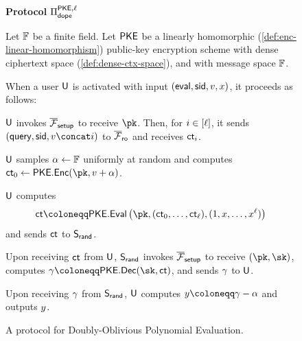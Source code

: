 \begin{figure}[h]
	\begin{center}
		\begin{techbox}
			\centerline{\textbf{Protocol} $\pdope[\ell]$}
			Let $\field$ be a finite field.
			Let $\encscheme$ be a linearly homomorphic (\cref{def:enc-linear-homomorphism}) public-key encryption scheme with dense ciphertext space (\cref{def:dense-ctx-space}), and with message space $\field$.

			\boxsep
			When a user $\user$ is activated with input $(\eval, \sid, \val, x)$, it proceeds as follows:
			\begin{algenumerate}
				\item $\user$ invokes $\fsetup$ to receive $\pk$.
				Then, for $i \in \nrange{\ell}$, it sends $(\query, \sid, \val \concat i)$ to $\frandoracle$ and receives $\ct_i$.

				\item $\user$ samples $\dopemask \gets \field$ uniformly at random and computes $\ct_0 \gets \encscheme.\Enc(\pk, v + \dopemask)$.

				\item $\user$ computes
				\begin{equation*}
					\dopectmasked \coloneqq \encscheme.\Eval\parens{\pk, (\ct_0, \dots, \ct_{\ell}), (1, x, \dots, x^{\ell})}
				\end{equation*}
				and sends $\dopectmasked$ to $\randserver$.

				\item Upon receiving $\dopectmasked$ from $\user$, $\randserver$ invokes $\fsetup$ to receive $(\pk, \sk)$, computes $\dopemaskedshare \coloneqq \encscheme.\Dec(\sk, \dopectmasked)$, and sends $\dopemaskedshare$ to $\user$.

				\item Upon receiving $\dopemaskedshare$ from $\randserver$, $\user$ computes $\dopeoutput \coloneqq \dopemaskedshare - \dopemask$ and outputs $\dopeoutput$.
			\end{algenumerate}
		\end{techbox}
	\end{center}
	\caption{A protocol for Doubly-Oblivious Polynomial Evaluation.}
	\label{fig:protocol_dope}
\end{figure}
